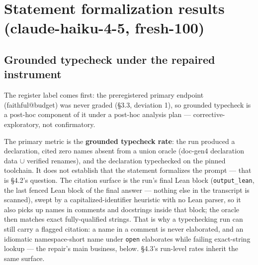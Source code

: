 \documentclass[10pt]{article}
\newcommand{\code}[1]{\texttt{#1}}
\begin{document}
\section{Statement formalization results (claude-haiku-4-5, fresh-100)}
\label{sec:tier1}

\subsection{Grounded typecheck under the repaired instrument}
\label{sec:gtc}

The register label comes first: the preregistered primary endpoint
(faithful@budget) was never graded (\S 3.3, deviation 1), so grounded
typecheck is a post-hoc component of it under a post-hoc analysis
plan --- corrective-exploratory, not confirmatory.

The primary metric is the \textbf{grounded typecheck rate}: the run
produced a declaration, cited zero names absent from a union oracle
(doc-gen4 declaration data $\cup$ verified renames), and the declaration
typechecked on the pinned toolchain. It does not establish that the
statement formalizes the prompt --- that is \S 4.2's question. The
citation surface is the run's final Lean block (\code{output\_lean}, the
last fenced Lean block of the final answer --- nothing else in the
transcript is scanned), swept by a capitalized-identifier heuristic with
no Lean parser, so it also picks up names in comments and docstrings
inside that block; the oracle then matches exact fully-qualified
strings. That is why a typechecking run can still carry a flagged
citation: a name in a comment is never elaborated, and an idiomatic
namespace-short name under \code{open} elaborates while failing
exact-string lookup --- the repair's main business, below. \S 4.3's
run-level rates inherit the same surface.
\end{document}
